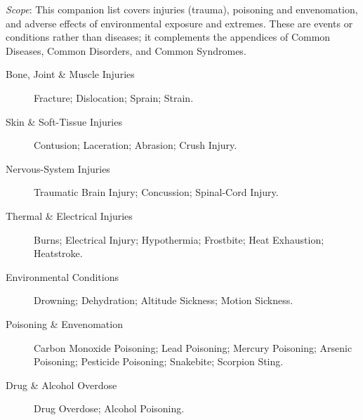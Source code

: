 \small
\noindent\textit{Scope}: This companion list covers injuries (trauma), poisoning and envenomation, and adverse effects of environmental exposure and extremes. These are events or conditions rather than diseases; it complements the appendices of Common Diseases, Common Disorders, and Common Syndromes.

\medskip
\begin{description}
\item[Bone, Joint \& Muscle Injuries] Fracture; Dislocation; Sprain; Strain.

\item[Skin \& Soft-Tissue Injuries] Contusion; Laceration; Abrasion; Crush Injury.

\item[Nervous-System Injuries] Traumatic Brain Injury; Concussion; Spinal-Cord Injury.

\item[Thermal \& Electrical Injuries] Burns; Electrical Injury; Hypothermia; Frostbite; Heat Exhaustion; Heatstroke.

\item[Environmental Conditions] Drowning; Dehydration; Altitude Sickness; Motion Sickness.

\item[Poisoning \& Envenomation] Carbon Monoxide Poisoning; Lead Poisoning; Mercury Poisoning; Arsenic Poisoning; Pesticide Poisoning; Snakebite; Scorpion Sting.

\item[Drug \& Alcohol Overdose] Drug Overdose; Alcohol Poisoning.
\end{description}